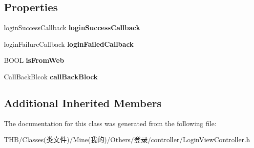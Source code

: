 \subsection*{Properties}
\begin{DoxyCompactItemize}
\item 
\mbox{\label{interface_login_view_controller_ab6488f196cb9d0ac27fc6bdbf96bd4b7}} 
login\+Success\+Callback {\bfseries login\+Success\+Callback}
\item 
\mbox{\label{interface_login_view_controller_a2dd44fcdffd9b95dc995091398aa44e9}} 
login\+Failure\+Callback {\bfseries login\+Failed\+Callback}
\item 
\mbox{\label{interface_login_view_controller_a2b7a237dea172c7e2fc2c5cb77cba886}} 
B\+O\+OL {\bfseries is\+From\+Web}
\item 
\mbox{\label{interface_login_view_controller_a4b0c1197a9814a44a7ec1fda7f685c88}} 
Call\+Back\+Blcok {\bfseries call\+Back\+Block}
\end{DoxyCompactItemize}
\subsection*{Additional Inherited Members}


The documentation for this class was generated from the following file\+:\begin{DoxyCompactItemize}
\item 
T\+H\+B/\+Classes(类文件)/\+Mine(我的)/\+Others/登录/controller/Login\+View\+Controller.\+h\end{DoxyCompactItemize}
